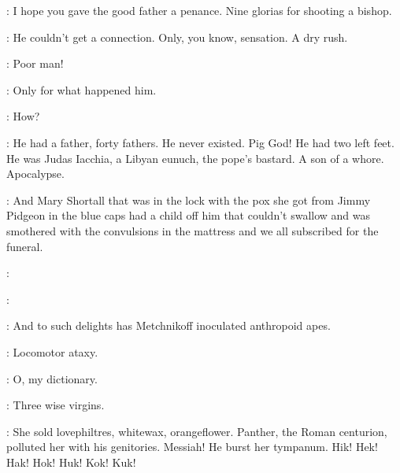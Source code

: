\Lynch:
I hope you gave the good father a penance.
Nine glorias for shooting a bishop.

\Zoe:
He couldn't get a connection.
Only, you know, sensation.
A dry rush.

\Bloom:
Poor man!

\Zoe:
Only for what happened him.

\Bloom:
How?

\Virag:
He had a father, forty fathers.
He never existed.
Pig God!
He had two left feet.
He was Judas Iacchia, a Libyan eunuch, the pope's bastard.
A son of a whore.
Apocalypse.

\Kitty:
And Mary Shortall that was in the lock with the pox
she got from Jimmy Pidgeon in the blue caps
had a child off him that couldn't swallow
and was smothered with the convulsions in the mattress
and we all subscribed for the funeral.

\PhilipDrunk:

\PhilipSober:


\Lynch:
And to such delights has Metchnikoff inoculated anthropoid apes.

\Florry:
Locomotor ataxy.

\Zoe:
O, my dictionary.

\Lynch:
Three wise virgins.

\Virag:
She sold lovephiltres, whitewax, orangeflower.
Panther, the Roman centurion, polluted her with his genitories.
Messiah!
He burst her tympanum.
Hik! Hek! Hak! Hok! Huk! Kok! Kuk!


